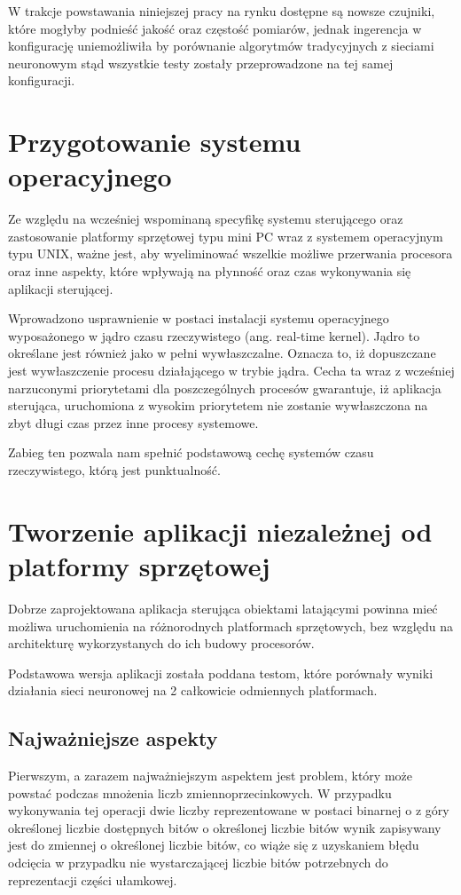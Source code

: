W trakcje powstawania niniejszej pracy na rynku dostępne są nowsze czujniki, które mogłyby podnieść jakość oraz częstość pomiarów, jednak ingerencja w konfigurację uniemożliwiła by porównanie algorytmów tradycyjnych z sieciami neuronowym stąd wszystkie testy zostały przeprowadzone na tej samej konfiguracji.




\section{Przygotowanie systemu operacyjnego}
Ze względu na wcześniej wspominaną specyfikę systemu sterującego oraz zastosowanie platformy sprzętowej typu mini PC wraz z systemem operacyjnym typu UNIX, ważne jest, aby wyeliminować wszelkie możliwe przerwania procesora oraz inne aspekty, które wpływają na płynność oraz czas wykonywania się aplikacji sterującej.

Wprowadzono usprawnienie w postaci instalacji systemu operacyjnego wyposażonego w jądro czasu rzeczywistego (ang. real-time kernel). Jądro to określane jest również jako w pełni wywłaszczalne. Oznacza to, iż dopuszczane jest wywłaszczenie procesu działającego w trybie jądra. Cecha ta wraz z wcześniej narzuconymi priorytetami dla poszczególnych procesów gwarantuje, iż aplikacja sterująca, uruchomiona z wysokim priorytetem nie zostanie wywłaszczona na zbyt długi czas przez inne procesy systemowe.



Zabieg ten pozwala nam spełnić podstawową cechę systemów czasu rzeczywistego, którą jest punktualność.




\section{Tworzenie aplikacji niezależnej od platformy sprzętowej}
Dobrze zaprojektowana aplikacja sterująca obiektami latającymi powinna mieć możliwa uruchomienia na różnorodnych platformach sprzętowych, bez względu na architekturę wykorzystanych do ich budowy procesorów.

Podstawowa wersja aplikacji została poddana testom, które porównały wyniki działania sieci neuronowej na 2 całkowicie odmiennych platformach. 


\subsection{Najważniejsze aspekty}
Pierwszym, a zarazem najważniejszym aspektem jest problem, który może powstać podczas mnożenia liczb zmiennoprzecinkowych. W przypadku wykonywania tej operacji dwie liczby reprezentowane w postaci binarnej o z góry określonej liczbie dostępnych bitów o określonej liczbie bitów  wynik zapisywany jest do zmiennej o określonej liczbie bitów, co wiąże się z uzyskaniem błędu odcięcia w przypadku nie wystarczającej liczbie bitów potrzebnych do reprezentacji części ułamkowej. 



